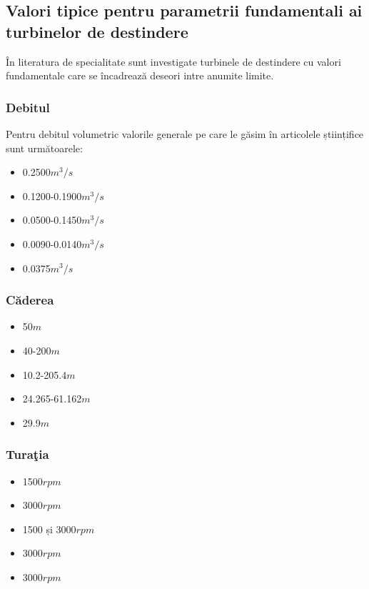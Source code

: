 \subsection{Valori tipice pentru parametrii fundamentali ai turbinelor de destindere}

În literatura de specialitate sunt investigate turbinele de destindere cu valori fundamentale care se încadrează deseori intre anumite limite.


\subsubsection{Debitul}
Pentru debitul volumetric valorile generale pe care le găsim în articolele științifice sunt următoarele:

\begin{itemize}
	\item 0.2500$\si{m^3/s}$ \cite{gentner2000experimentelle}
	\item 0.1200-0.1900$\si{m^3/s}$ \cite{GREES_2014}
	\item 0.0500-0.1450$\si{m^3/s}$ \cite{susanhub}
	\item 0.0090-0.0140$\si{m^3/s}$ \cite{biner2016engineering}
	\item 0.0375$\si{m^3/s}$ \cite{hasmatuchi2014new}
\end{itemize}


\subsubsection{C\u{a}derea}

\begin{itemize}
	\item 50$\si{m}$ \cite{gentner2000experimentelle}
	\item 40-200$\si{m}$ \cite{GREES_2014}
	\item 10.2-205.4$\si{m}$ \cite{susanhub}
	\item 24.265-61.162$\si{m}$ \cite{biner2016engineering}
	\item 29.9$\si{m}$ \cite{hasmatuchi2014new}
\end{itemize}


\subsubsection{Tura\c{t}ia}

\begin{itemize}
	\item 1500$\si{rpm}$ \cite{gentner2000experimentelle}
	\item 3000$\si{rpm}$ \cite{GREES_2014}
	\item 1500 și 3000$\si{rpm}$ \cite{susanhub}
	\item 3000$\si{rpm}$ \cite{biner2016engineering}
	\item 3000$\si{rpm}$ \cite{hasmatuchi2014new}
\end{itemize}

